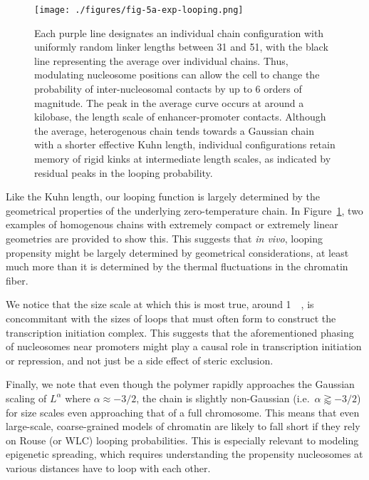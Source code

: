 \documentclass[%
 reprint,
superscriptaddress,
showpacs,preprintnumbers,
 amsmath,amssymb,
 aps,
 prl,
]{revtex4-1}
\begin{document}
\begin{figure}[t]
    \centering
    \texttt{[image: ./figures/fig-5a-exp-looping.png]}
    \caption{Each purple line designates an individual chain configuration
    with uniformly random linker lengths between 31 and \SI{51}{\basepair}, with
    the black line representing the average over individual chains. Thus, modulating nucleosome positions can allow the cell to change
    the probability of inter-nucleosomal contacts by up to 6 orders of
    magnitude. The peak in the average curve occurs at around a kilobase, the
    length scale of enhancer-promoter contacts. Although the average,
    heterogenous chain tends towards a Gaussian chain with a shorter
    effective Kuhn length, individual configurations retain memory of rigid kinks
    at intermediate length scales, as indicated by residual peaks in the looping
    probability.}\label{fig:looping}
\end{figure}

Like the Kuhn length, our looping function is largely determined by the
    geometrical properties of the underlying zero-temperature chain.
In Figure~\ref{fig:looping}, two examples of homogenous chains with extremely
    compact or extremely linear geometries are provided to show this.
This suggests that \textit{in vivo}, looping propensity might be largely
    determined by geometrical considerations, at least much more than it is
    determined by the thermal fluctuations in the chromatin fiber.

We notice that the size scale at which this is most true, around
    \SI{1}{\kilo\basepair}, is concommitant with the sizes of loops that must
    often form to construct the transcription initiation complex.
This suggests that the aforementioned phasing of nucleosomes near promoters
    might play a causal role in transcription initiation or repression, and not
    just be a side effect of steric exclusion.

Finally, we note that even though the polymer rapidly approaches the Gaussian
    scaling of $L^\alpha$ where $\alpha \approx -3/2$, the chain is slightly
    non-Gaussian (i.e.\ $\alpha \gtrapprox -3/2$) for size scales even
    approaching that of a full chromosome.
This means that even large-scale, coarse-grained models of chromatin are likely
    to fall short if they rely on Rouse (or WLC) looping probabilities.
This is especially relevant to modeling epigenetic spreading, which requires
    understanding the propensity nucleosomes at various distances have to loop with
    each other.
\end{document}
